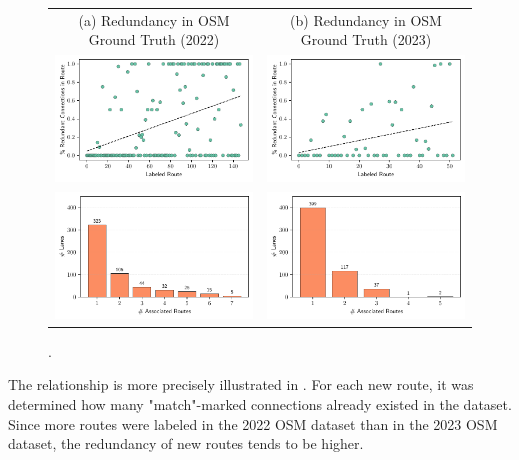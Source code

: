 \begin{figure}[htbp]
\centering 
\begin{tabular}{cc}
\footnotesize{(a) Redundancy in OSM Ground Truth (2022)} & \footnotesize{(b) Redundancy in OSM Ground Truth (2023)} \\
\includegraphics[width=0.45\linewidth]{images/matching-ground-truth-progression-osm-old.pdf} & \includegraphics[width=0.45\linewidth]{images/matching-ground-truth-progression-osm.pdf} \\
\includegraphics[width=0.45\linewidth]{images/matching-ground-truth-lsas-per-route-osm-old.pdf} & \includegraphics[width=0.45\linewidth]{images/matching-ground-truth-lsas-per-route-osm.pdf} \\
\end{tabular}
\caption{.}
\label{fig:ground-truth-routes-per-lanes-osm}
\end{figure}

The relationship is more precisely illustrated in . For each new route, it was determined how many "match"-marked connections already existed in the dataset. Since more routes were labeled in the 2022 OSM dataset than in the 2023 OSM dataset, the redundancy of new routes tends to be higher.


